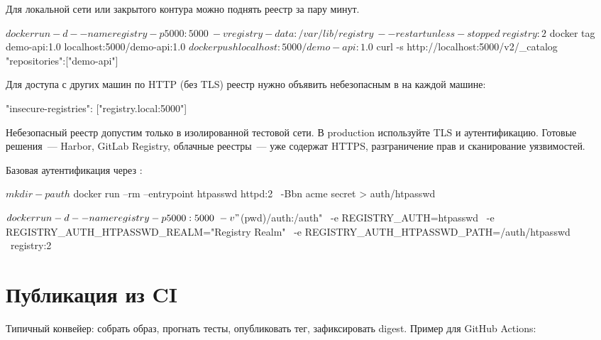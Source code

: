 Для локальной сети или закрытого контура можно поднять реестр
за пару минут.

\begin{code}[language=bash]
$ docker run -d --name registry -p 5000:5000 \
    -v registry-data:/var/lib/registry \
    --restart unless-stopped \
    registry:2

$ docker tag demo-api:1.0 localhost:5000/demo-api:1.0
$ docker push localhost:5000/demo-api:1.0
$ curl -s http://localhost:5000/v2/_catalog
{"repositories":["demo-api"]}
\end{code}

Для доступа с других машин по HTTP (без TLS) реестр нужно объявить
небезопасным в  на каждой машине:

\begin{code}[language=bash]
{
  "insecure-registries": ["registry.local:5000"]
}
\end{code}

\begin{warnbox}
Небезопасный реестр допустим только в изолированной тестовой сети.
В production используйте TLS и аутентификацию. Готовые решения~---
Harbor, GitLab Registry, облачные реестры~--- уже содержат HTTPS,
разграничение прав и сканирование уязвимостей.
\end{warnbox}

Базовая аутентификация через :

\begin{code}[language=bash]
$ mkdir -p auth
$ docker run --rm --entrypoint htpasswd httpd:2 \
    -Bbn acme secret > auth/htpasswd

$ docker run -d --name registry -p 5000:5000 \
    -v "$(pwd)/auth:/auth" \
    -e REGISTRY_AUTH=htpasswd \
    -e REGISTRY_AUTH_HTPASSWD_REALM="Registry Realm" \
    -e REGISTRY_AUTH_HTPASSWD_PATH=/auth/htpasswd \
    registry:2
\end{code}

\section{Публикация из CI}

Типичный конвейер: собрать образ, прогнать тесты, опубликовать тег,
зафиксировать digest. Пример для GitHub Actions:

